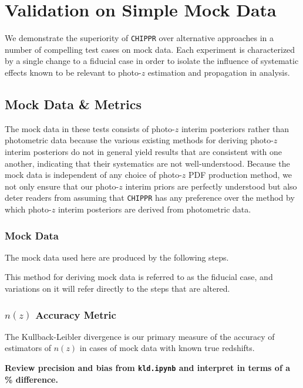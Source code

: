 \documentclass[iop]{emulateapj}
\newcommand{\chippr}{\texttt{CHIPPR} }
\begin{document}
\section{Validation on Simple Mock Data}
\label{sec:validation}

We demonstrate the superiority of \chippr over alternative approaches in a number of compelling test cases on mock data.  Each experiment is characterized by a single change to a fiducial case in order to isolate the influence of systematic effects known to be relevant to photo-$z$ estimation and propagation in analysis.  

\subsection{Mock Data \& Metrics}
\label{sec:validintro}

The mock data in these tests consists of photo-$z$ interim posteriors rather than photometric data because the various existing methods for deriving photo-$z$ interim posteriors do not in general yield results that are consistent with one another, indicating that their systematics are not well-understood.  Because the mock data is independent of any choice of photo-$z$ PDF production method, we not only ensure that our photo-$z$ interim priors are perfectly understood but also deter readers from assuming that \chippr has any preference over the method by which photo-$z$ interim posteriors are derived from photometric data.

\subsubsection{Mock Data}
\label{sec:mockdata}

The mock data used here are produced by the following steps.  

This method for deriving mock data is referred to as the fiducial case, and variations on it will refer directly to the steps that are altered.

\subsubsection{$n(z)$ Accuracy Metric}
\label{sec:accuracy}

The Kullback-Leibler divergence is our primary measure of the accuracy of estimators of $n(z)$ in cases of mock data with known true redshifts.

\textbf{Review precision and bias from \texttt{kld.ipynb} and interpret in terms of a \% difference.}
\end{document}

